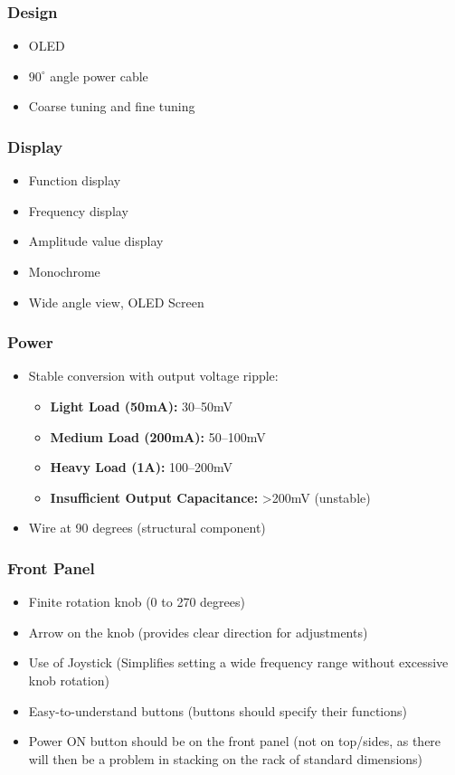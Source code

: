 \documentclass[12pt,a4paper]{article}
\begin{document}
\subsubsection{Design}
\begin{itemize}
    \item OLED
    \item $90^\circ$ angle power cable
    \item Coarse tuning and fine tuning
\end{itemize}

\subsubsection{Display}
\begin{itemize}
    \item Function display
    \item Frequency display
    \item Amplitude value display
    \item Monochrome
    \item Wide angle view, OLED Screen

\end{itemize}

\subsubsection{Power}
\begin{itemize}
    \item Stable conversion with output voltage ripple:
    \begin{itemize}
        \item \textbf{Light Load (50mA):} 30--50mV
        \item \textbf{Medium Load (200mA):} 50--100mV
        \item \textbf{Heavy Load (1A):} 100--200mV
        \item \textbf{Insufficient Output Capacitance:} \textgreater 200mV (unstable)
    \end{itemize}
    \item Wire at 90 degrees (structural component)
\end{itemize}

\subsubsection{Front Panel}
\begin{itemize}
    \item Finite rotation knob (0 to 270 degrees)
    \item Arrow on the knob (provides clear direction for adjustments)
    \item Use of Joystick (Simplifies setting a wide frequency range without excessive knob rotation)
    \item Easy-to-understand buttons (buttons should specify their functions)
    \item Power ON button should be on the front panel (not on top/sides, as there will then be a problem in stacking on the rack of standard dimensions)
\end{itemize}
\end{document}
